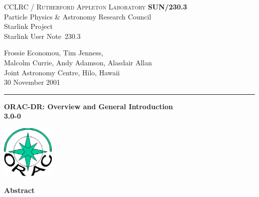 \documentclass[twoside,11pt]{article}
\newcommand{\stardoccategory}  {Starlink User Note}
\newcommand{\stardocinitials}  {SUN}
\newcommand{\stardocnumber}    {230.3}
\newcommand{\stardocauthors}   {Frossie Economou, Tim Jenness,\\ 
Malcolm Currie, Andy Adamson, Alasdair Allan\\
Joint Astronomy Centre, Hilo, Hawaii}
\newcommand{\stardocdate}      {30 November 2001}
\newcommand{\stardoctitle}     {ORAC-DR: Overview and General Introduction}
\newcommand{\stardocversion}   {3.0-0}
\newcommand{\stardocmanual}    {}
\newcommand{\stardocname}{\stardocinitials /\stardocnumber}
\newenvironment{latexonly}{}{}
\renewcommand{\_}{\texttt{\symbol{95}}}
\begin{document}
\thispagestyle{empty}

\begin{latexonly}
   CCLRC / \textsc{Rutherford Appleton Laboratory} \hfill \textbf{\stardocname}\\
   {\large Particle Physics \& Astronomy Research Council}\\
   {\large Starlink Project\\}
   {\large \stardoccategory\ \stardocnumber}
   \begin{flushright}
   \stardocauthors\\
   \stardocdate
   \end{flushright}
   \vspace{-4mm}
   \rule{\textwidth}{0.5mm}
   \vspace{5mm}
   \begin{center}
   {\Huge\textbf{\stardoctitle \\ [2.5ex]}}
   {\LARGE\textbf{\stardocversion \\ [4ex]}}
   {\Huge\textbf{\stardocmanual}}
   \end{center}
   \vspace{5mm}

\begin{center}
\includegraphics[width=1.0in]{sun230_logo.eps}
\end{center}

   \vspace{10mm}
   \begin{center}
      {\Large\textbf{Abstract}}
   \end{center}
\end{latexonly}
\end{document}

